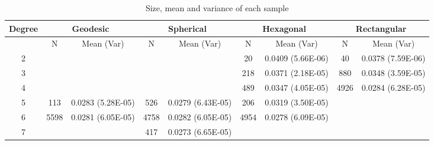 \begin{table}
\centering
\scriptsize
\begin{minipage}{\textwidth}
\caption{Size, mean and variance of each sample}
\label{meanvar1}
\begin{tabular}{|c||cc|cc|cc|cc|}
\hline
\textbf{Degree} & \multicolumn{2}{c|}{\textbf{Geodesic}} &
\multicolumn{2}{c|}{\textbf{Spherical}} &
\multicolumn{2}{c|}{\textbf{Hexagonal}} &
\multicolumn{2}{c|}{\textbf{Rectangular}} \\
\hline
& N & Mean (Var) & N & Mean (Var) & N & Mean (Var) & N & Mean (Var) \\
\hline
2&&&&& 20& 0.0409 (5.66E-06)& 40& 0.0378 (7.59E-06)\\ 
3&&&&& 218& 0.0371 (2.18E-05)& 880& 0.0348 (3.59E-05)\\ 
4&&&&& 489& 0.0347 (4.05E-05)& 4926& 0.0284 (6.28E-05)\\ 
5& 113& 0.0283 (5.28E-05)& 526& 0.0279 (6.43E-05)& 206& 0.0319 (3.50E-05)&&\\ 
6& 5598& 0.0281 (6.05E-05)& 4758& 0.0282 (6.05E-05)& 4954& 0.0278
(6.09E-05)&&\\ 
7&&& 417& 0.0273 (6.65E-05)&&&&\\ 
\hline
\end{tabular} \end{minipage} \end{table}





